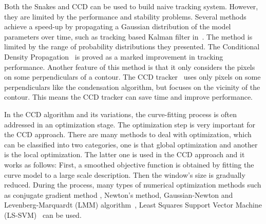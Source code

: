 \documentclass[conference]{IEEEtran}
\begin{document}
Both the Snakes and CCD can be used to build naive tracking
system. However, they are limited by the performance and stability
problems. Several methods achieve a speed-up by propagating a Gaussian
distribution of the model parameters over time, such as tracking based
Kalman filter in~\cite{brookner1998tracking}. The method is limited by the range of probability
distributions they presented. The Conditional
Density Propagation~\cite{isard1998icondensation} is proved as a marked improvement in tracking performance. Another feature of
this method is that it only considers the pixels on some
perpendiculars of a contour. The CCD tracker~\cite{hanek2004fitting} uses only
pixels on some perpendiculars like the condensation algorithm, but
focuses on the vicinity of the contour. This means the CCD tracker can
save time and improve performance.

In the CCD algorithm and its variations, the curve-fitting process is
often addressed in an optimization stage. The optimization step is
very important for the CCD approach. There are many methods to
deal with optimization, which can be classified into two
categories, one is that global optimization and another is the local
optimization. The latter one is used in the CCD
approach and it works as follows: First, a smoothed objective function is obtained by fitting
the curve model to a large scale description. Then the window's size is
gradually reduced. During the process, many types of  numerical
optimization methods such as  conjugate gradient method , Newton's
method, Gaussian-Newton and Levenberg-Marquardt
(LMM) algorithm~\cite{contourpanin2011}, Least Squares Support Vector
Machine (LS-SVM)~\cite{vapnik2000nature} can be used.
\end{document}
